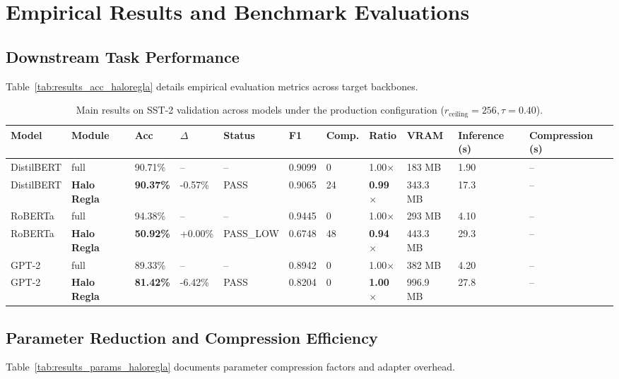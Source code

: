 \section{Empirical Results and Benchmark Evaluations}

\subsection{Downstream Task Performance}
Table~\ref{tab:results_acc_haloregla} details empirical evaluation metrics across target backbones.

\begin{table}[t]
\centering
\small
\begin{tabular}{lllllllllll}
\toprule
\textbf{Model} & \textbf{Module} & \textbf{Acc} & \textbf{$\Delta$} & \textbf{Status} & \textbf{F1} & \textbf{Comp.} & \textbf{Ratio} & \textbf{VRAM} & \textbf{Inference (s)} & \textbf{Compression (s)} \\
\midrule
DistilBERT & full & 90.71\% & -- & -- & 0.9099 & 0 & 1.00$\times$ & 183 MB & 1.90 & -- \\
DistilBERT & \textbf{Halo Regla} & \textbf{90.37\%} & -0.57\% & PASS & 0.9065 & 24 & \textbf{0.99$\times$} & 343.3 MB & 17.3 & -- \\
RoBERTa & full & 94.38\% & -- & -- & 0.9445 & 0 & 1.00$\times$ & 293 MB & 4.10 & -- \\
RoBERTa & \textbf{Halo Regla} & \textbf{50.92\%} & +0.00\% & PASS\_LOW & 0.6748 & 48 & \textbf{0.94$\times$} & 443.3 MB & 29.3 & -- \\
GPT-2 & full & 89.33\% & -- & -- & 0.8942 & 0 & 1.00$\times$ & 382 MB & 4.20 & -- \\
GPT-2 & \textbf{Halo Regla} & \textbf{81.42\%} & -6.42\% & PASS & 0.8204 & 0 & \textbf{1.00$\times$} & 996.9 MB & 27.8 & -- \\
\bottomrule
\end{tabular}
\caption{Main results on SST-2 validation across models under the production configuration ($r_{\mathrm{ceiling}}=256, \tau=0.40$).}
\label{tab:main_sst2}
\end{table}

\subsection{Parameter Reduction and Compression Efficiency}
Table~\ref{tab:results_params_haloregla} documents parameter compression factors and adapter overhead.


